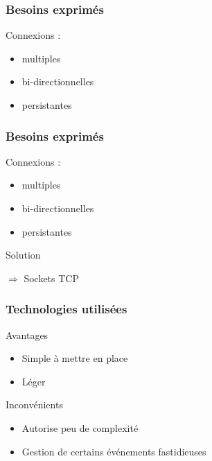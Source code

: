 \begin{frame}
	\frametitle{Besoins exprimés}
		Connexions :
		\vspace{0.5cm}
		\begin{itemize}
			\item multiples
			\item bi-directionnelles
			\item persistantes
		\end{itemize}
\end{frame}

\begin{frame}
	\frametitle{Besoins exprimés}
		Connexions :
		\vspace{0.5cm}
		\begin{itemize}
			\item multiples
			\item bi-directionnelles
			\item persistantes
		\end{itemize}
		\begin{block}{Solution}
			\begin{center}
				$\Rightarrow$ Sockets TCP
			\end{center}
		\end{block}
\end{frame}


\begin{frame}
	\frametitle{Technologies utilisées}
	\begin{block}{Avantages}
		\begin{itemize}
			\item Simple à mettre en place
			\item Léger
		\end{itemize}
	\end{block}
	\begin{block}{Inconvénients}
		\begin{itemize}
			\item Autorise peu de complexité
			\item Gestion de certains événements fastidieuses
		\end{itemize}
	\end{block}
\end{frame}
